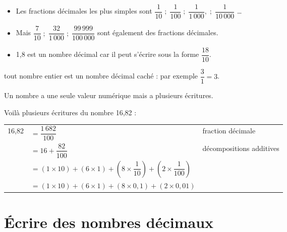 \begin{exemple*1}
   \begin{itemize}
      \item Les fractions décimales les plus \og simples \fg{} sont $\dfrac{1}{10} \; ; \; \dfrac{1}{100} \; ; \;\dfrac{1}{1\,000}, \; ; \;\dfrac{1}{10\,000}$ \dots{}
      \item  Mais $\dfrac{7}{10} \; ; \; \dfrac{32}{1\,000}  \; ; \; \dfrac{99\,999}{100\,000}$ sont également des fractions décimales.
      \item 1,8 est un nombre décimal car il peut s'écrire sous la forme $\dfrac{18}{10}$. \\ [-9mm]
   \end{itemize}
\end{exemple*1}

\begin{remarque}
   tout nombre entier est un nombre décimal \og caché \fg : par exemple $\dfrac{3}{1} =3$.
\end{remarque}

Un nombre a une seule valeur numérique mais a plusieurs écritures.
   
\begin{exemple*1}
   Voilà plusieurs écritures du nombre 16,82 : \par\medskip
    {
    \begin{tabular}{cp{7cm}p{4cm}}
      16,82 & $=\dfrac{1\,682}{100}$ & fraction décimale \\
      & $=16+\dfrac{82}{100}$ & décompositions additives \\
      & $=(1\times10)+(6\times1)+\left(8\times\dfrac{1}{10}\right)+\left(2\times\dfrac{1}{100}\right)$ & \\
      & $= (1\times10)+(6\times1)+(8\times0,1)+(2\times0,01)$ & \\  
   \end{tabular}}
\end{exemple*1}


\section{Écrire des nombres décimaux} %


